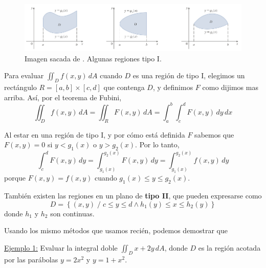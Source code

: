 \documentclass[12pt]{article}
\begin{document}
\begin{figure}[H]
  \centering
  \includegraphics[width=\linewidth]{imagenes/regiones-tipo-1.png}
  \caption{Imagen sacada de \parencite{stewart2}. Algunas regiones tipo I.}
  \label{fig:regiones-tipo-1}
\end{figure}

Para evaluar $ \iint_{D} f(x,y) \,dA $ cuando $ D $ es una región de tipo I, elegimos un rectángulo $ R=\left[a,b\right]\times \left[c,d\right] $ que contenga $ D $, y definimos $ F $ como dijimos mas arriba. Así, por el teorema de Fubini,
\[
  \iint_{D} f(x,y) \,dA=\iint_{R} F(x,y) \,dA=\int_{a}^{b} \int_{c}^{d} F(x,y) \,dy\,dx
\]

Al estar en una región de tipo I, y por cómo está definida $ F $ sabemos que $ F(x,y)=0 $ si $ y<g_{1}(x) $ o $ y>g_{2}(x) $. Por lo tanto,
\[
  \int_{c}^{d} F(x,y) \,dy = \int_{g_{1}(x)}^{g_{2}(x)} F(x,y) \,dy=\int_{g_{1}(x)}^{g_{2}(x)} f(x,y) \,dy
\]
porque $ F(x,y)=f(x,y) $ cuando $ g_{1}(x)\leq y\leq g_{2}(x) $.

\vspace{0.2cm}
\vspace{0.2cm}

También existen las regiones en un plano de \textbf{tipo II}, que pueden expresarse como
\[
  D=\left\{(x,y) \;/\; c\leq y\leq d \land h_{1}(y)\leq x\leq h_{2}(y)\right\}
\]
donde $ h_{1} $ y $ h_{2} $ son continuas.

Usando los mismo métodos que usamos recién, podemos demostrar que

\vspace{0.2cm}
\vspace{0.2cm}

\underline{Ejemplo 1:} Evaluar la integral doble $ \iint_{D} x+2y \,dA $, donde $ D $ es la región acotada por las parábolas $ y=2x^2 $ y $ y=1+x^2 $.
\end{document}
